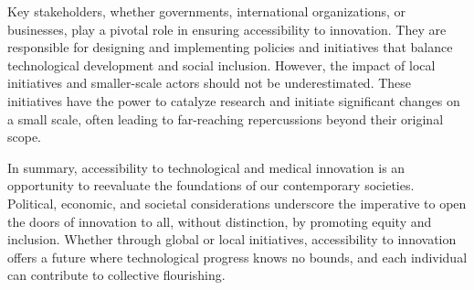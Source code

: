 Key stakeholders, whether governments, international organizations, or businesses, play a pivotal role in ensuring accessibility to innovation. They are responsible for designing and implementing policies and initiatives that balance technological development and social inclusion. However, the impact of local initiatives and smaller-scale actors should not be underestimated. These initiatives have the power to catalyze research and initiate significant changes on a small scale, often leading to far-reaching repercussions beyond their original scope.

In summary, accessibility to technological and medical innovation is an opportunity to reevaluate the foundations of our contemporary societies. Political, economic, and societal considerations underscore the imperative to open the doors of innovation to all, without distinction, by promoting equity and inclusion. Whether through global or local initiatives, accessibility to innovation offers a future where technological progress knows no bounds, and each individual can contribute to collective flourishing.